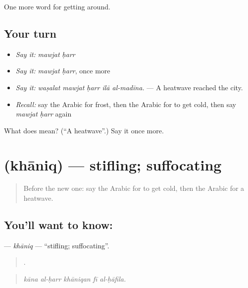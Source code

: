 \begin{grammarlens}[title={What you've built}]
One more word for getting around.
\end{grammarlens}

\subsection*{Your turn}
\begin{itemize}
\raggedright
  \item \emph{Say it:} \emph{mawjat ḥarr}
  \item \emph{Say it:} \emph{mawjat ḥarr}, once more
  \item \emph{Say it:} \emph{waṣalat mawjat ḥarr ilā al-madīna.} — A heatwave reached the city.
  \item \emph{Recall:} say the Arabic for frost, then the Arabic for to get cold, then say \emph{mawjat ḥarr} again
\end{itemize}

\begin{tcolorbox}[breakable,colback=teal!4,colframe=teal!35!black,title={Before you move on}]
What does   mean? (\textquotedblleft{}A heatwave\textquotedblright{}.) Say it once more.
\end{tcolorbox}
\section[\texorpdfstring{\ar{خانق} (khāniq)}{خانق (khāniq)}]{ (khāniq) — stifling; suffocating}

\label{lesson:AR-C484-khaniq}



\begin{quote}
Before the new one: say the Arabic for to get cold, then the Arabic for a heatwave.
\end{quote}

\subsection*{You'll want to know: }
\textbf{} — \emph{khāniq} — \textquotedblleft{}stifling; suffocating\textquotedblright{}.

\begin{quote}
    .
\end{quote}

\begin{quote}
\emph{kāna al-ḥarr khāniqan fī al-ḥāfila.}
\end{quote}

